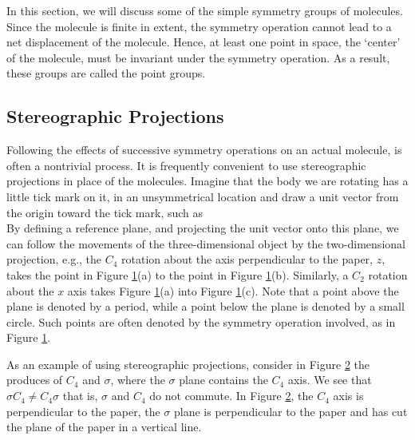 In this section, we will discuss some of the simple symmetry groups 
of molecules.  Since the molecule is finite in extent, the symmetry 
operation cannot lead to a net displacement of the molecule.  Hence, 
at least one point in space, the `center' of the molecule, must be 
invariant under the symmetry operation.  As a result, these groups 
are called the point groups.

\subsection{Stereographic Projections}

Following the effects of successive symmetry operations on an actual 
molecule, is often a nontrivial process.  It is frequently convenient 
to use stereographic projections in place of the molecules.  Imagine 
that the body we are rotating has a little tick mark on it, in an 
unsymmetrical location and draw a unit vector from the origin toward 
the tick mark, such as
\begin{equation}
\end{equation}
By defining a reference plane, and projecting the unit vector onto
this plane, we can follow the movements of the three-dimensional
object by the two-dimensional projection, e.g., the $C_4$ rotation
about the axis perpendicular to the paper, $z$, takes the point in
Figure \ref{chap16-fig8}(a) to the point in Figure
\ref{chap16-fig8}(b).  Similarly, a $C_2$ rotation about the $x$ axis
takes Figure \ref{chap16-fig8}(a) into Figure \ref{chap16-fig8}(c).
Note that a point above the plane is denoted by a period, while a
point below the plane is denoted by a small circle.  Such points are
often denoted by the symmetry operation involved, as in Figure
\ref{chap16-fig8}.

\begin{figure}
\caption{}
\label{chap16-fig8}
\end{figure}

\begin{figure}
\caption{}
\label{chap16-fig9}
\end{figure}

As an example of using stereographic projections, consider in Figure
\ref{chap16-fig9} the produces of $C_4$ and $\sigma$, where the
$\sigma$ plane contains the $C_4$ axis.  We see that $\sigma C_4 \not=
C_4\sigma$ that is, $\sigma$ and $C_4$ do not commute.  In Figure
\ref{chap16-fig9}, the $C_4$ axis is perpendicular to the paper, the
$\sigma$ plane is perpendicular to the paper and has cut the plane of
the paper in a vertical line.

